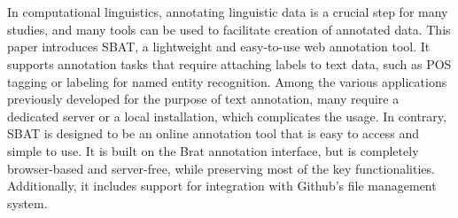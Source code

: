 \documentclass[12ptm a4paper]{article}
\begin{document}
% 
\newpage
\section*{}
In computational linguistics, annotating linguistic data is a crucial step for many studies, and many tools can be used to facilitate creation of annotated data. This paper introduces SBAT, a lightweight and easy-to-use web annotation tool. It supports annotation tasks that require attaching labels to text data, such as POS tagging or labeling for named entity recognition. Among the various applications previously developed for the purpose of text annotation, many require a dedicated server or a local installation, which complicates the usage. In contrary, SBAT is designed to be an online annotation tool that is easy to access and simple to use. It is built on the Brat annotation interface, but is completely browser-based and server-free, while preserving most of the key functionalities. Additionally, it includes support for integration with Github's file management system.
\newpage
\tableofcontents
\newpage
\listoffigures
\newpage
{}
\end{document}
